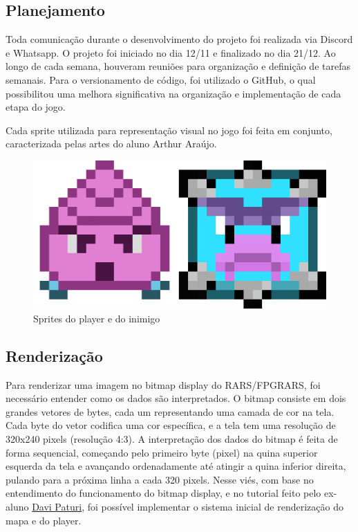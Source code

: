 \documentclass[a4paper]{sbgames}
\begin{document}
\subsection{Planejamento}{
\label{sec:planejamento} 


Toda comunicação durante o desenvolvimento do projeto foi realizada via Discord e Whatsapp. O projeto foi iniciado no dia 12/11 e finalizado no dia 21/12. Ao longo de cada semana, houveram reuniões para organização e definição de tarefas semanais. Para o versionamento de código, foi utilizado o GitHub, o qual possibilitou uma melhora significativa na organização e implementação de cada etapa do jogo.

Cada sprite utilizada para representação visual no jogo foi feita em conjunto, caracterizada pelas artes do aluno Arthur Araújo.
}

\begin{figure}[htb]
  \begin{center}
   \includegraphics[width=1.0\linewidth]{./Figures/spritezinhas.png}
  \end{center}
  \caption{Sprites do player e do inimigo}
  \label{fig:01}
\end{figure}

\subsection{Renderização}
\label{sec:render}

Para renderizar uma imagem no bitmap display do RARS/FPGRARS, foi necessário entender como os dados são interpretados. O bitmap consiste em dois grandes vetores de bytes, cada um representando uma camada de cor na tela. Cada byte do vetor codifica uma cor específica, e a tela tem uma resolução de 320x240 pixels (resolução 4:3). A interpretação dos dados do bitmap é feita de forma sequencial, começando pelo primeiro byte (pixel) na quina superior esquerda da tela e avançando ordenadamente até atingir a quina inferior direita, pulando para a próxima linha a cada 320 pixels.
Nesse viés, com base no entendimento do funcionamento do bitmap display, e no tutorial feito pelo ex-aluno \href{https://www.youtube.com/watch?v=2BBPNgLP6_s}{Davi Paturi}, foi possível implementar o sistema inicial de renderização do mapa e do player.
\end{document}
